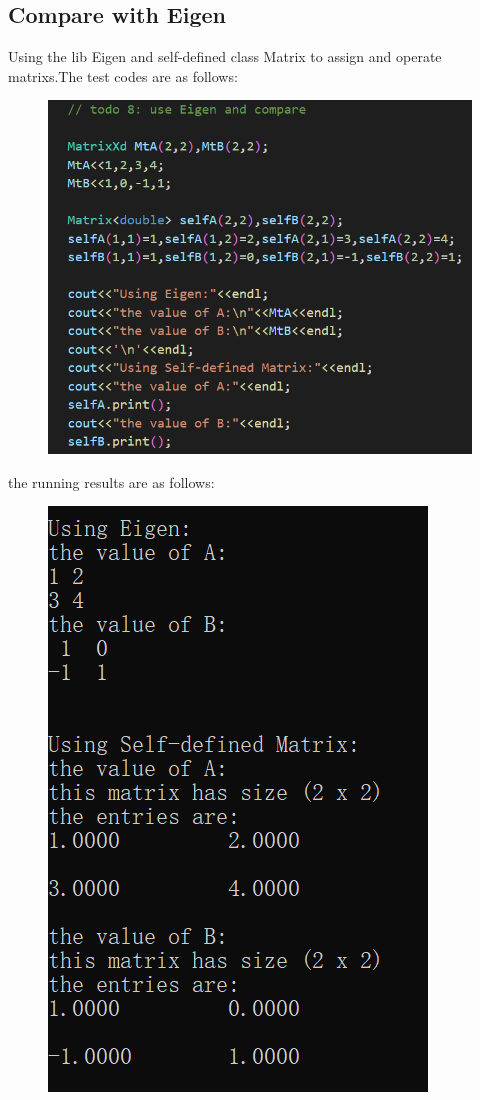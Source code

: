 \documentclass[12pt]{article}
\begin{document}
\subsection{Compare with Eigen}
Using the lib Eigen and self-defined class Matrix to assign and operate matrixs.The test codes are as follows:
\begin{figure}[H]
    \centering
    \includegraphics{pic3.png}
\end{figure}
the running results are as follows:
\begin{figure}[H]
    \centering
    \includegraphics{pic4.png}
\end{figure}
\end{document}
